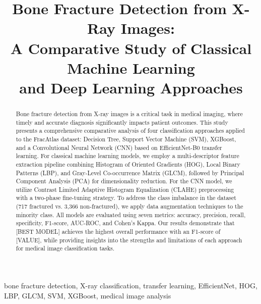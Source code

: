 \documentclass[conference]{IEEEtran}
\begin{document}
\title{Bone Fracture Detection from X-Ray Images:\\
A Comparative Study of Classical Machine Learning\\and Deep Learning Approaches}

\author{
}

\maketitle

\begin{abstract}
Bone fracture detection from X-ray images is a critical task in medical imaging, where timely and accurate diagnosis significantly impacts patient outcomes. This study presents a comprehensive comparative analysis of four classification approaches applied to the FracAtlas dataset: Decision Tree, Support Vector Machine (SVM), XGBoost, and a Convolutional Neural Network (CNN) based on EfficientNet-B0 transfer learning. For classical machine learning models, we employ a multi-descriptor feature extraction pipeline combining Histogram of Oriented Gradients (HOG), Local Binary Patterns (LBP), and Gray-Level Co-occurrence Matrix (GLCM), followed by Principal Component Analysis (PCA) for dimensionality reduction. For the CNN model, we utilize Contrast Limited Adaptive Histogram Equalization (CLAHE) preprocessing with a two-phase fine-tuning strategy. To address the class imbalance in the dataset (717 fractured vs. 3,366 non-fractured), we apply data augmentation techniques to the minority class. All models are evaluated using seven metrics: accuracy, precision, recall, specificity, F1-score, AUC-ROC, and Cohen's Kappa. Our results demonstrate that [BEST MODEL] achieves the highest overall performance with an F1-score of [VALUE], while providing insights into the strengths and limitations of each approach for medical image classification tasks.
\end{abstract}

\begin{IEEEkeywords}
bone fracture detection, X-ray classification, transfer learning, EfficientNet, HOG, LBP, GLCM, SVM, XGBoost, medical image analysis
\end{IEEEkeywords}
\end{document}
